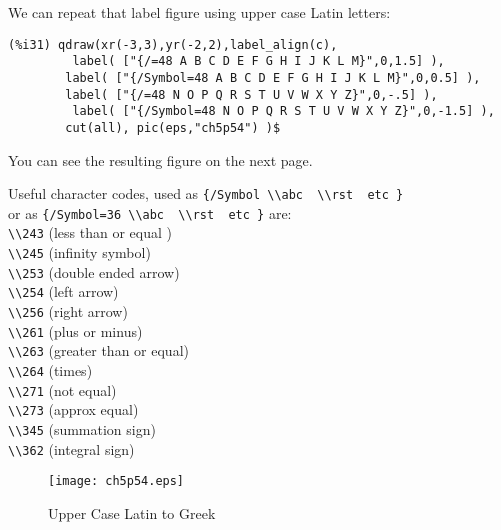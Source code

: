 \documentclass[12pt]{article}
\begin{document}
\smallskip

We can repeat that label figure using upper case Latin letters:
\small
\begin{verbatim}
(%i31) qdraw(xr(-3,3),yr(-2,2),label_align(c),
         label( ["{/=48 A B C D E F G H I J K L M}",0,1.5] ),
        label( ["{/Symbol=48 A B C D E F G H I J K L M}",0,0.5] ),
        label( ["{/=48 N O P Q R S T U V W X Y Z}",0,-.5] ),
         label( ["{/Symbol=48 N O P Q R S T U V W X Y Z}",0,-1.5] ),   
        cut(all), pic(eps,"ch5p54") )$
\end{verbatim}
\normalsize
You can see the resulting figure on the next page.

\smallskip
\smallskip
Useful character codes, used as \verb|{/Symbol \\abc  \\rst  etc }|\\
  or as   \verb|{/Symbol=36 \\abc  \\rst  etc }| are:\\
\verb|\\243| (less than or equal )\\
\verb|\\245| (infinity symbol)\\
\verb|\\253| (double ended arrow)\\
\verb|\\254| (left arrow)\\
\verb|\\256| (right arrow)\\
\verb|\\261| (plus or minus)\\
\verb|\\263| (greater than or equal)\\
\verb|\\264| (times)\\
\verb|\\271| (not equal)\\
\verb|\\273| (approx equal)\\
\verb|\\345| (summation sign)\\
\verb|\\362| (integral sign)\\

\begin{figure} [h]
   \centerline{\texttt{[image: ch5p54.eps]} }
	\caption{Upper Case Latin to Greek}
\end{figure}      
\end{document}
